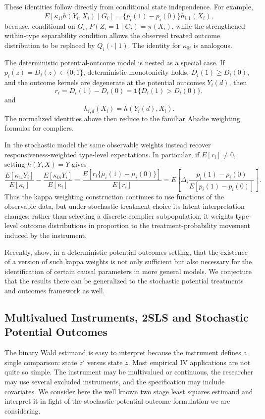 \documentclass[11pt]{article}
\newcommand{\1}{\mathbf{1}}
\begin{document}
These identities follow directly from conditional state independence. For
example,
\[
E[\kappa_{1i}h(Y_i,X_i)\mid G_i]
=
\{p_i(1)-p_i(0)\}\bar h_{i,1}(X_i),
\]
because, conditional on \(G_i\),
\(P(Z_i=1\mid G_i)=\pi(X_i)\), while the strengthened
within-type separability condition allows the observed treated outcome
distribution to be replaced by \(Q_i(\cdot\mid1)\). The identity for
\(\kappa_{0i}\) is analogous.

The deterministic potential-outcome model is nested as a special case. If
\(p_i(z)=D_i(z)\in\{0,1\}\), deterministic monotonicity holds,
\(D_i(1)\geq D_i(0)\), and the outcome kernels are degenerate at the
potential outcomes \(Y_i(d)\), then
\[
r_i
=
D_i(1)-D_i(0)
=
\mathbf 1\{D_i(1)>D_i(0)\},
\]
and
\[
\bar h_{i,d}(X_i)=h(Y_i(d),X_i).
\]
The normalized identities above then reduce to the familiar Abadie
weighting formulas for compliers.

In the stochastic model the same observable weights instead recover
responsiveness-weighted type-level expectations. In particular, if
\(E[r_i]\neq0\), setting \(h(Y,X)=Y\) gives
\[
\frac{E[\kappa_{1i}Y_i]}{E[\kappa_i]}
-
\frac{E[\kappa_{0i}Y_i]}{E[\kappa_i]}
=
\frac{E[r_i\{\mu_i(1)-\mu_i(0)\}]}{E[r_i]}
=
E\!\left[
\Delta_i
\frac{p_i(1)-p_i(0)}
     {E[p_i(1)-p_i(0)]}
\right].
\]
Thus the kappa weighting construction continues to use functions of the
observable data, but under stochastic treatment choice its latent
interpretation changes: rather than selecting a discrete complier
subpopulation, it weights type-level outcome distributions in proportion to
the treatment-probability movement induced by the instrument.

Recently, \cite{navjeenanetal2026} show, in a deterministic potential outcomes setting, that the existence of a version of such kappa weights is not only sufficient but also necessary for the identification of certain causal parameters in more general models.  We conjecture that the results there can be generalized to the stochastic potential treatments and outcomes framework as well.

\subsection{Multivalued Instruments, 2SLS and Stochastic Potential Outcomes}
\label{subsec:tsls}

The binary Wald estimand is easy to interpret because the instrument defines a single
comparison: state \(z'\) versus state \(z\). Most empirical IV applications are not quite
so simple. The instrument may be multivalued or continuous, the researcher may use
several excluded instruments, and the specification may include covariates. We consider here the well known two stage least squares estimand and interpret it in light of the stochastic potential outcome formulation we are considering. 
\end{document}
